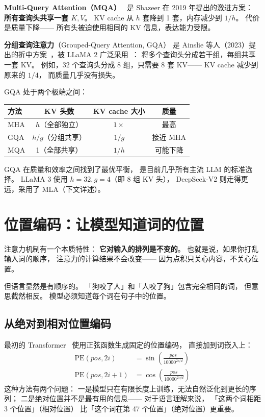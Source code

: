 \textbf{Multi-Query Attention（MQA）}~\cite{shazeer2019mqa}
是 Shazeer 在 2019 年提出的激进方案：
\textbf{所有查询头共享一套 $K, V$}。
KV cache 从 $h$ 套降到 1 套，内存减少到 $1/h$。
代价是质量下降——
所有头被迫使用相同的 KV 信息，表达能力受限。

\textbf{分组查询注意力}（Grouped-Query Attention, GQA）
是 Ainslie 等人（2023）提出的折中方案~\cite{ainslie2023gqa}，被 LLaMA 2 广泛采用~\cite{dubey2024llama3}：
将多个查询头分成若干组，每组共享一套 KV。
例如，32 个查询头分成 8 组，只需要 8 套 KV——
KV cache 减少到原来的 $1/4$，
而质量几乎没有损失。

GQA 处于两个极端之间：

\begin{center}
\begin{tabular}{lccc}
\hline
\textbf{方法} & \textbf{KV 头数} & \textbf{KV cache 大小} & \textbf{质量} \\
\hline
MHA  & $h$（全部独立） & $1\times$ & 最高 \\
GQA  & $h/g$（分组共享） & $1/g$ & 接近 MHA \\
MQA  & 1（全部共享） & $1/h$ & 可能下降 \\
\hline
\end{tabular}
\end{center}

GQA 在质量和效率之间找到了最优平衡，
是目前几乎所有主流 LLM 的标准选择。
LLaMA 3 使用 $h = 32, g = 4$（即 8 组 KV 头），
DeepSeek-V2 则走得更远，采用了 MLA（下文详述）。

\section{位置编码：让模型知道词的位置}

注意力机制有一个本质特性：
\textbf{它对输入的排列是不变的}。
也就是说，如果你打乱输入词的顺序，
注意力的计算结果不会改变——
因为点积只关心内容，不关心位置。

但语言显然是有顺序的。
「狗咬了人」和「人咬了狗」包含完全相同的词，
但意思截然相反。
模型必须知道每个词在句子中的位置。

\subsection{从绝对到相对位置编码}

最初的 Transformer~\cite{vaswani2017attention} 使用正弦函数生成固定的位置编码，
直接加到词嵌入上：
\begin{align}
  \mathrm{PE}(pos, 2i) &= \sin\!\left(\frac{pos}{10000^{2i/d}}\right) \\
  \mathrm{PE}(pos, 2i+1) &= \cos\!\left(\frac{pos}{10000^{2i/d}}\right)
\end{align}
这种方法有两个问题：
一是模型只在有限长度上训练，无法自然泛化到更长的序列；
二是绝对位置并不是最有用的信息——
对于语言理解来说，
「这两个词相距 3 个位置」（相对位置）
比「这个词在第 47 个位置」（绝对位置）更重要。

